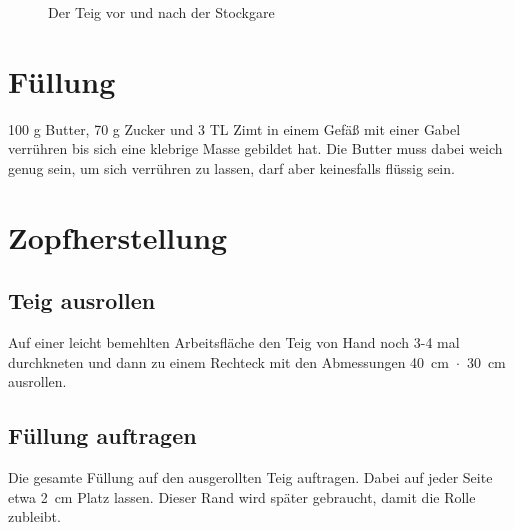 \documentclass[a4paper, oneside]{recipe}
\begin{document}
\begin{figure}[h]
  \centering
  \qquad
  \label{fig:vor_nach_stockgare}
  \caption{Der Teig vor und nach der Stockgare}
\end{figure}

\section*{Füllung}
100 g Butter, 70 g Zucker und 3 TL Zimt in einem Gefäß mit einer Gabel verrühren bis sich eine klebrige Masse gebildet hat. Die Butter muss dabei weich genug sein, um sich verrühren zu lassen, darf aber keinesfalls flüssig sein.

\section*{Zopfherstellung}
\subsection*{Teig ausrollen}
Auf einer leicht bemehlten Arbeitsfläche den Teig von Hand noch 3-4 mal durchkneten und dann zu einem Rechteck mit den Abmessungen 40~cm~$\cdot$~30~cm ausrollen.

\subsection*{Füllung auftragen}
Die gesamte Füllung auf den ausgerollten Teig auftragen. Dabei auf jeder Seite etwa 2~cm Platz lassen. Dieser Rand wird später gebraucht, damit die Rolle zubleibt.
\end{document}
